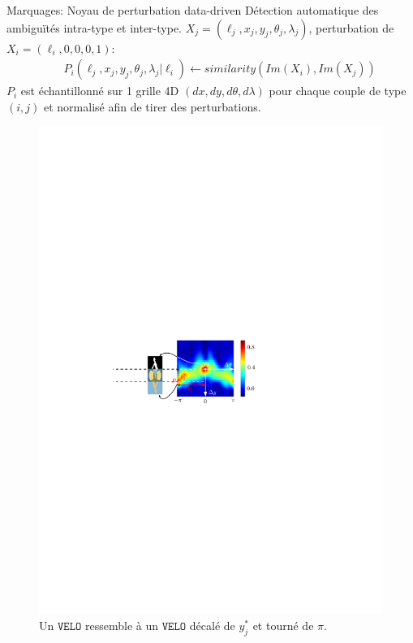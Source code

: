 \documentclass{beamer}
\begin{document}
\begin{frame}{Marquages: Noyau de perturbation data-driven}
Détection automatique des ambiguïtés intra-type et inter-type.
$X_j=(\ell_j,x_j,y_j,\theta_j,\lambda_j)$, perturbation de $X_i=(\ell_i,0,0,0,1)$:
\begin{eqnarray}
\nonumber && P_i(\ell_j,x_j,y_j,\theta_j,\lambda_j | \ell_i) \leftarrow similarity(Im(X_i),Im(X_j))
\end{eqnarray} 
$P_i$ est échantillonné sur 1 grille 4D $(dx,dy,d\theta,d\lambda)$ pour chaque couple de type $(i,j)$ et normalisé afin de tirer des perturbations. 
\begin{figure}
\centering
\includegraphics[width = 0.8\linewidth]{correlation_velo_velo}
\caption{Un $\texttt{VELO}$ ressemble à un $\texttt{VELO}$ décalé de $y_j^*$ et tourné de $\pi$.}
\end{figure}
\end{frame}
\end{document}
